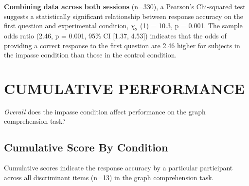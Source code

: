 \documentclass[
  letterpaper,
  DIV=11,
  numbers=noendperiod]{scrreprt}
\begin{document}
\textbf{Combining data across both sessions} (n=330), a Pearson's
Chi-squared test suggests a statistically significant relationship
between response accuracy on the first question and experimental
condition, \(\chi_2\) (1) = 10.3, p = 0.001. The sample odds ratio
(2.46, p = 0.001, 95\% CI {[}1.37, 4.53{]}) indicates that the odds of
providing a correct response to the first question are 2.46 higher for
subjects in the impasse condition than those in the control condition.

\hypertarget{cumulative-performance}{%
\section{CUMULATIVE PERFORMANCE}\label{cumulative-performance}}

\emph{Overall} does the impasse condition affect performance on the
graph comprehension task?

\hypertarget{cumulative-score-by-condition}{%
\subsection{Cumulative Score By
Condition}\label{cumulative-score-by-condition}}

Cumulative scores indicate the response accuracy by a particular
participant across all discriminant items (n=13) in the graph
comprehension task.
\end{document}
